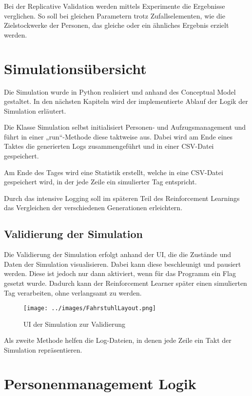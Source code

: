 \documentclass[envcountsame, envcountchap, deutsch]{i-studis}
\begin{document}
Bei der Replicative Validation werden mittels Experimente die Ergebnisse
verglichen. So soll bei gleichen Parametern trotz Zufallselementen, wie
die Zielstockwerke der Personen, das gleiche oder ein ähnliches Ergebnis
erzielt werden.

\hypertarget{simulationsuxfcbersicht}{%
\chapter{Simulationsübersicht}\label{simulationsuxfcbersicht}}

Die Simulation wurde in Python realisiert und anhand des Conceptual
Model gestaltet. In den nächsten Kapiteln wird der implementierte Ablauf
der Logik der Simulation erläutert.

Die Klasse Simulation selbst initialisiert Personen- und
Aufzugsmanagement und führt in einer „run``-Methode diese taktweise aus.
Dabei wird am Ende eines Taktes die generierten Logs zusammengeführt und
in einer CSV-Datei gespeichert.

Am Ende des Tages wird eine Statistik erstellt, welche in eine CSV-Datei
gespeichert wird, in der jede Zeile ein simulierter Tag entspricht.

Durch das intensive Logging soll im späteren Teil des Reinforcement
Learnings das Vergleichen der verschiedenen Generationen erleichtern.

\hypertarget{validierung-der-simulation}{%
\section{Validierung der Simulation}\label{validierung-der-simulation}}

Die Validierung der Simulation erfolgt anhand der UI, die die Zustände
und Daten der Simulation visualisieren. Dabei kann diese beschleunigt
und pausiert werden. Diese ist jedoch nur dann aktiviert, wenn für das
Programm ein Flag gesetzt wurde. Dadurch kann der Reinforcement Learner
später einen simulierten Tag verarbeiten, ohne verlangsamt zu werden.

\begin{figure}
\centering
\texttt{[image: ../images/FahrstuhlLayout.png]}
\caption{UI der Simulation zur Validierung\label{ui}}
\end{figure}

Als zweite Methode helfen die Log-Dateien, in denen jede Zeile ein Takt
der Simulation repräsentieren.

\hypertarget{personenmanagement-logik}{%
\chapter{Personenmanagement Logik}\label{personenmanagement-logik}}
\end{document}
